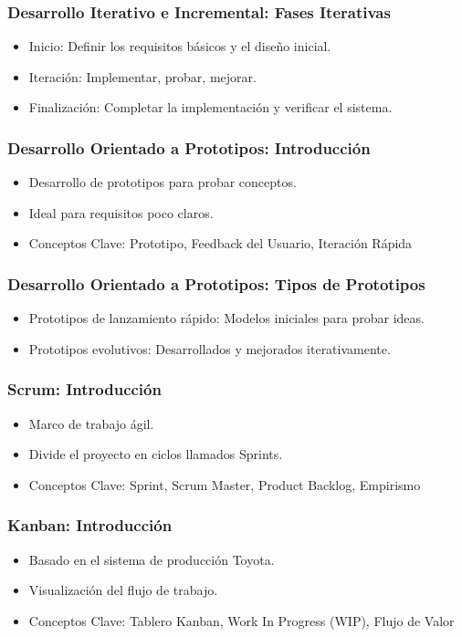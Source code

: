 \documentclass[aspectratio=169]{beamer}
\begin{document}
\begin{frame}
	\frametitle{Desarrollo Iterativo e Incremental: Fases Iterativas}
	\begin{itemize}
		\item Inicio: Definir los requisitos básicos y el diseño inicial.
		\item Iteración: Implementar, probar, mejorar.
		\item Finalización: Completar la implementación y verificar el sistema.
	\end{itemize}
\end{frame}

\begin{frame}
	\frametitle{Desarrollo Orientado a Prototipos: Introducción}
	\begin{itemize}
		\item Desarrollo de prototipos para probar conceptos.
		\item Ideal para requisitos poco claros.
		\item Conceptos Clave: Prototipo, Feedback del Usuario, Iteración Rápida
	\end{itemize}
\end{frame}

\begin{frame}
	\frametitle{Desarrollo Orientado a Prototipos: Tipos de Prototipos}
	\begin{itemize}
		\item Prototipos de lanzamiento rápido: Modelos iniciales para probar ideas.
		\item Prototipos evolutivos: Desarrollados y mejorados iterativamente.
	\end{itemize}
\end{frame}

\begin{frame}
	\frametitle{Scrum: Introducción}
	\begin{itemize}
		\item Marco de trabajo ágil.
		\item Divide el proyecto en ciclos llamados Sprints.
		\item Conceptos Clave: Sprint, Scrum Master, Product Backlog, Empirismo
	\end{itemize}
\end{frame}

\begin{frame}
	\frametitle{Kanban: Introducción}
	\begin{itemize}
		\item Basado en el sistema de producción Toyota.
		\item Visualización del flujo de trabajo.
		\item Conceptos Clave: Tablero Kanban, Work In Progress (WIP), Flujo de Valor
	\end{itemize}
\end{frame}
\end{document}
